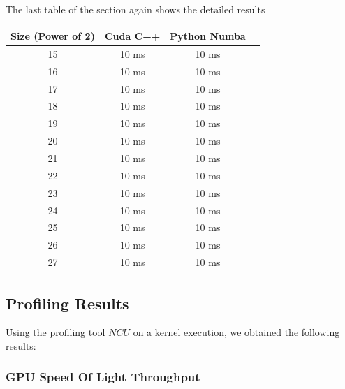 \documentclass[a4paper, 12pt, oneside]{article}
\begin{document}
The last table of the section again shows the detailed results

\begin{center}
  \begin{tabular}{ |c|c|c|c| }
    \hline
    \textbf{Size (Power of 2)} & \textbf{Cuda C++} & \textbf{Python Numba} \\
    \hline
    15                         & 10 ms             & 10 ms                 \\
    16                         & 10 ms             & 10 ms                 \\
    17                         & 10 ms             & 10 ms                 \\
    18                         & 10 ms             & 10 ms                 \\
    19                         & 10 ms             & 10 ms                 \\
    20                         & 10 ms             & 10 ms                 \\
    21                         & 10 ms             & 10 ms                 \\
    22                         & 10 ms             & 10 ms                 \\
    23                         & 10 ms             & 10 ms                 \\
    24                         & 10 ms             & 10 ms                 \\
    25                         & 10 ms             & 10 ms                 \\
    26                         & 10 ms             & 10 ms                 \\
    27                         & 10 ms             & 10 ms                 \\
    \hline
  \end{tabular}
\end{center}

\subsection{Profiling Results}

Using the profiling tool $NCU$ on a kernel execution, we obtained the following results:\\

\subsubsection{GPU Speed Of Light Throughput}
\end{document}

